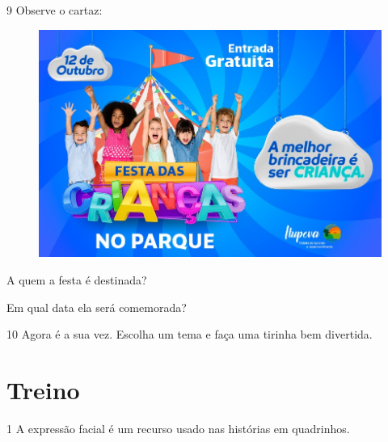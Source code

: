 \pagebreak
\num{9} Observe o cartaz:

\begin{figure}[htpb!]
\centering
\includegraphics[width=.8\textwidth]{media/image135.jpeg}
\end{figure}


\begin{escolha}
\item A quem a festa é destinada?


\item Em qual data ela será comemorada?

\end{escolha}

\num{10} Agora é a sua vez. Escolha um tema e faça uma tirinha bem divertida.

\begin{mdframed}[linewidth=2pt,linecolor=salmao]
\vspace{4cm}
\end{mdframed}

\pagebreak
\section*{Treino}

\num{1} A expressão facial é um recurso usado nas histórias em quadrinhos.

